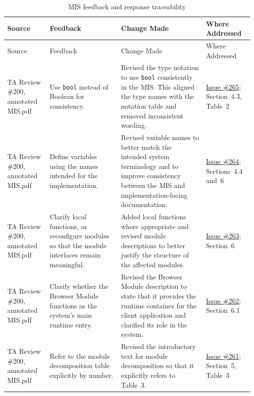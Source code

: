 \documentclass{article}
\begin{document}
\begin{longtable}{p{} p{}
                  p{} p{}}
\caption{MIS feedback and response traceability}
\label{tab:mis-trace}\\
\toprule
Source & Feedback & Change Made & Where Addressed \\
\midrule
\endfirsthead

\toprule
Source & Feedback & Change Made & Where Addressed \\
\midrule
\endhead

\bottomrule
\endfoot

TA Review \#200,
annotated MIS.pdf
&
Use \texttt{bool} instead of Boolean for consistency.
&
Revised the type notation to use \texttt{bool} consistently in the MIS.
This aligned the type names with the notation table and removed
inconsistent wording.
&
\href{https://github.com/thaafei/DomainX/issues/265}{Issue \#265};
Section~4.3, Table~2
\\

TA Review \#200,
annotated MIS.pdf
&
Define variables using the names intended for the implementation.
&
Revised variable names to better match the intended system terminology
and to improve consistency between the MIS and implementation-facing
documentation.
&
\href{https://github.com/thaafei/DomainX/issues/264}{Issue \#264};
Sections~4.4 and~6
\\

TA Review \#200,
annotated MIS.pdf
&
Clarify local functions, or reconfigure modules so that the module
interfaces remain meaningful.
&
Added local functions where appropriate and revised module descriptions
to better justify the structure of the affected modules.
&
\href{https://github.com/thaafei/DomainX/issues/263}{Issue \#263};
Section~6
\\

TA Review \#200,
annotated MIS.pdf
&
Clarify whether the Browser Module functions as the system's main
runtime entry.
&
Revised the Browser Module description to state that it provides the
runtime container for the client application and clarified its role in
the system.
&
\href{https://github.com/thaafei/DomainX/issues/262}{Issue \#262};
Section~6.1
\\

TA Review \#200,
annotated MIS.pdf
&
Refer to the module decomposition table explicitly by number.
&
Revised the introductory text for module decomposition so that it
explicitly refers to Table~3.
&
\href{https://github.com/thaafei/DomainX/issues/261}{Issue \#261};
Section~5, Table~3
\\


\end{longtable}
\end{document}
